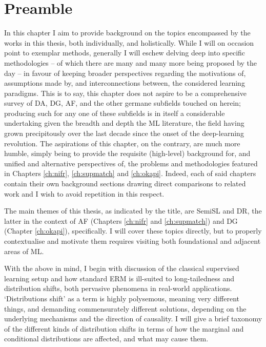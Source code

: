 \section*{Preamble}
\noindent
%
In this chapter I aim to provide background on the topics encompassed by the works in this thesis,
both individually, and holistically.
%
While I will on occasion point to exemplar methods, generally I will eschew delving deep into
specific methodologies -- of which there are many and many more being proposed by the day -- in
favour of keeping broader perspectives regarding the motivations of, assumptions made by, and
interconnections between, the considered learning paradigms. 
%
This is to say, this chapter does not aspire to be a comprehensive survey of \ac{DA}, \ac{DG},
\ac{AF}, and the other germane subfields touched on herein; producing such for any one of these
subfields is in itself a considerable undertaking given the breadth and depth the \ac{ML}
literature, the field having grown precipitously over the last decade since the onset of the
deep-learning revolution.
%
The aspirations of this chapter, on the contrary, are much more humble, simply being to provide the
requisite (high-level) background for, and unified and alternative perspectives of, the problems
and methodologies featured in Chapters \ref{ch:nifr}, \ref{ch:supmatch} and \ref{ch:okapi}.
%
Indeed, each of said chapters contain their own background sections drawing direct comparisons to
related work and I wish to avoid repetition in this respect.

The main themes of this thesis, as indicated by the title, are \ac{SemiSL} and \ac{DR}, the latter
in the context of \ac{AF} (Chapters \ref{ch:nifr} and \ref{ch:supmatch}) and \ac{DG} (Chapter
\ref{ch:okapi}), specifically. 
%
I will cover these topics directly, but to properly contextualise and motivate them requires
visiting both foundational and adjacent areas of \acl{ML}.

%
With the above in mind, I begin with discussion of the classical supervised learning setup and how
standard \ac{ERM} is ill-suited to long-tailedness and distribution shifts, both pervasive
phenomena in real-world applications. 
%
`Distributions shift' as a term is highly polysemous, meaning very different things, and demanding
commensurately different solutions, depending on the underlying mechanisms and the direction of
causality. 
%
I will give a brief taxonomy of the different kinds of distribution shifts in terms of how the
marginal and conditional distributions are affected, and what may cause them. 

